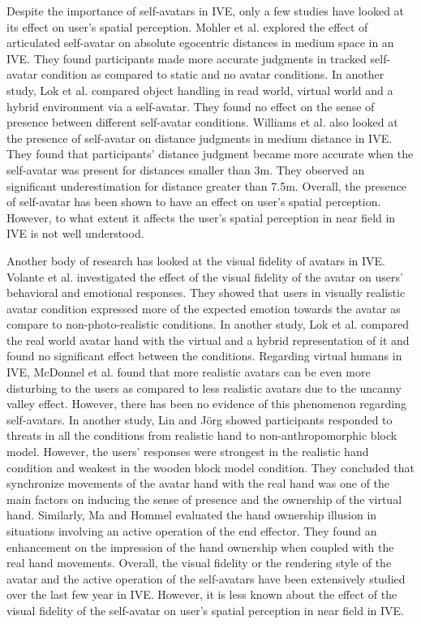 Despite the importance of self-avatars in IVE, only a few studies have looked at its effect on user's spatial perception. Mohler et al. \cite{MCW+10} explored the effect of articulated self-avatar on absolute egocentric distances in medium space in an IVE. They found participants made more accurate judgments in tracked self-avatar condition as compared to static and no avatar conditions. In another study, Lok et al. \cite{LNW+03} compared object handling in read world, virtual world and a hybrid environment via a self-avatar. They found no effect on the sense of presence between different self-avatar conditions. Williams et al. \cite{WJS+08} also looked at the presence of self-avatar on distance judgments in medium distance in IVE. They found that participants' distance judgment became more accurate when the self-avatar was present for distances smaller than 3m. They observed an significant underestimation for distance greater than 7.5m. Overall, the presence of self-avatar has been shown to have an effect on user's spatial perception. However, to what extent it affects the user's spatial perception in near field in IVE is not well understood.
 
Another body of research has looked at the visual fidelity of avatars in IVE. Volante et al. \cite{VBC+16} investigated the effect of the visual fidelity of the avatar on users' behavioral and emotional responses. They showed that users in visually realistic avatar condition expressed more of the expected emotion towards the avatar as compare to non-photo-realistic conditions. In another study, Lok et al. \cite{LNW+03} compared the real world avatar hand with the virtual and a hybrid representation of it and found no significant effect between the conditions. Regarding virtual humans in IVE, McDonnel et al. \cite{MBB12} found that more realistic avatars can be even more disturbing to the users as compared to less realistic avatars due to the uncanny valley effect. However, there has been no evidence of this phenomenon regarding self-avatars. In another study, Lin and J{\"o}rg \cite{LJ16} showed participants responded to threats in all the conditions from realistic hand to non-anthropomorphic block model. However, the users' responses were strongest in the realistic hand condition and weakest in the wooden block model condition. They concluded that synchronize movements of the avatar hand with the real hand was one of the main factors on inducing the sense of presence and the ownership of the virtual hand. Similarly, Ma and Hommel \cite{MH15} evaluated the hand ownership illusion in situations involving an active operation of the end effector. They found an enhancement on the impression of the hand ownership when coupled with the real hand movements. Overall, the visual fidelity or the rendering style of the avatar and the active operation of the self-avatars have been extensively studied over the last few year in IVE. However, it is less known about the effect of the visual fidelity of the self-avatar on user's spatial perception in near field in IVE.



